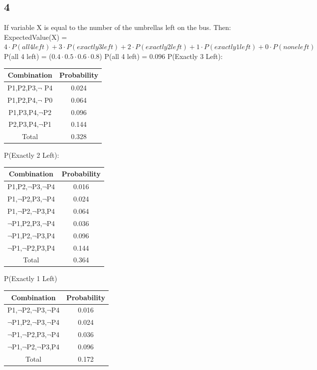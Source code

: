 \documentclass{article}
\begin{document}
	\subsection*{4}
	If variable X is equal to the number of the umbrellas left on the bus. Then:
	\newline
	ExpectedValue(X) =$4\cdot P(all 4 left) + 3\cdot P(exactly 3 left) + 2\cdot P(exactly 2 left) + 1 \cdot P(exactly 1 left) + 0\cdot P(none left) $
	\newline
	P(all 4 left) = ($0.4\cdot0.5\cdot0.6\cdot0.8$)
	\newline
	P(all 4 left) = $0.096$
	\newline
	P(Exactly 3 Left):
	\begin{center}
	\begin{tabular}{|c|c|}
	\hline
	Combination&Probability\\
	\hline
	P1,P2,P3,$\neg$ P4&0.024 \\	
	\hline
	P1,P2,P4,$\neg$ P0&0.064 \\
	\hline
	P1,P3,P4,$\neg$P2 & 0.096\\
	\hline
	P2,P3,P4,$\neg$P1&0.144 \\
	\hline
	Total & 0.328\\
	\hline
	\end{tabular}
	\end{center}
	P(Exactly 2 Left):
	\begin{center}
	\begin{tabular}{|c|c|}
	\hline
	Combination&Probability\\
	\hline
	P1,P2,$\neg$P3,$\neg$P4&0.016\\
	\hline
	P1,$\neg$P2,P3,$\neg$P4&0.024\\
	\hline
	P1,$\neg$P2,$\neg$P3,P4&0.064\\
	\hline
	$\neg$P1,P2,P3,$\neg$P4&0.036\\
	\hline
	$\neg$P1,P2,$\neg$P3,P4&0.096\\
	\hline
	$\neg$P1,$\neg$P2,P3,P4&0.144\\
	\hline
	Total & 0.364\\
	\hline
	\end{tabular}
	\end{center}
	P(Exactly 1 Left)
	\begin{center}
	\begin{tabular}{|c|c|}
	\hline
	Combination&Probability\\
	\hline
	P1,$\neg$P2,$\neg$P3,$\neg$P4&0.016\\
	\hline
	$\neg$P1,P2,$\neg$P3,$\neg$P4&0.024\\
	\hline
	$\neg$P1,$\neg$P2,P3,$\neg$P4&0.036\\
	\hline
	$\neg$P1,$\neg$P2,$\neg$P3,P4&0.096\\
	\hline
	Total&0.172\\
	\hline
	\end{tabular}
	\end{center}	
\end{document}
